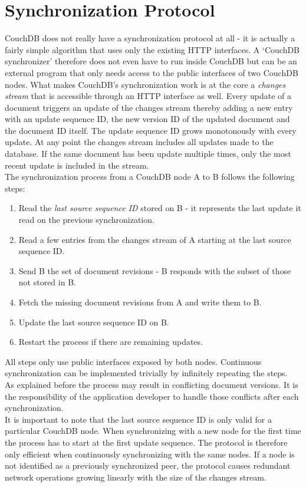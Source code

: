 \section{Synchronization Protocol}
\label{sec:couchdb.protocol}
CouchDB does not really have a synchronization protocol at all - it is actually a fairly simple algorithm that uses only the existing HTTP interfaces.
A `CouchDB synchronizer' therefore does not even have to run inside CouchDB but can be an external program that only needs access to the public interfaces of two CouchDB nodes.
What makes CouchDB's synchronization work is at the core a \emph{changes stream} that is accessible through an HTTP interface as well.
Every update of a document triggers an update of the changes stream thereby adding a new entry with an update sequence ID, the new version ID of the updated document and the document ID itself.
The update sequence ID grows monotonously with every update.
At any point the changes stream includes all updates made to the database.
If the same document has been update multiple times, only the most recent update is included in the stream.\\

The synchronization process from a CouchDB node A to B follows the following steps:

\begin{enumerate}
\item Read the \emph{last source sequence ID} stored on B - it represents the last update it read on the previous synchronization.
\item Read a few entries from the changes stream of A starting at the last source sequence ID.
\item Send B the set of document revisions - B responds with the subset of those not stored in B.
\item Fetch the missing document revisions from A and write them to B.
\item Update the last source sequence ID on B.
\item Restart the process if there are remaining updates.
\end{enumerate}

All steps only use public interfaces exposed by both nodes.
Continuous synchronization can be implemented trivially by infinitely repeating the steps.\\
As explained before the process may result in conflicting document versions.
It is the responsibility of the application developer to handle those conflicts after each synchronization.\\
It is important to note that the last source sequence ID is only valid for a particular CouchDB node.
When synchronizing with a new node for the first time the process has to start at the first update sequence.
The protocol is therefore only efficient when continuously synchronizing with the same nodes.
If a node is not identified as a previously synchronized peer, the protocol causes redundant network operations growing linearly with the size of the changes stream.


